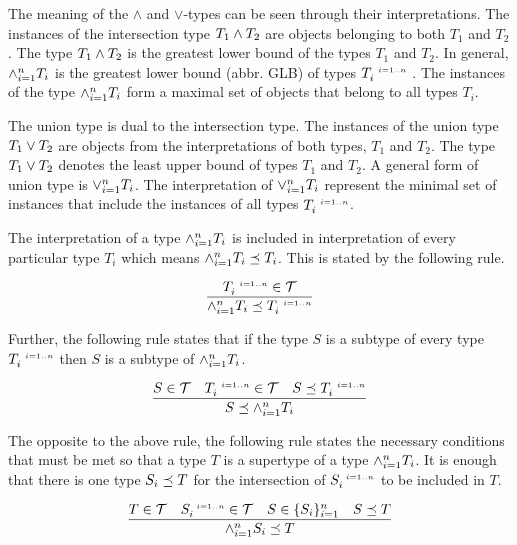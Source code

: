 \documentclass[runningheads]{llncs}
\newcommand{\s}{\scriptscriptstyle\ \,}
\newcommand{\T}{{\cal T}}
\begin{document}
The meaning of the $\land$ and $\lor$-types can be seen through
their interpretations. The instances of the intersection type
$T_1\land\/T_2$ are objects belonging to both $T_1$ and $T_2$. The
type $T_1\land\/T_2$ is the greatest lower bound of the types $T_1$
and $T_2$. In general, $\land_{i=1}^n\/T_i$ is the greatest lower
bound (abbr. GLB) of types $T_i^{\s\/i=1..n}$
\cite{Pierce1991,Pierce1996}. The instances of the type
$\land_{i=1}^n\/T_i$ form a maximal set of objects that belong to
all types $T_i$.

The union type is dual to the intersection type. The instances of
the union type $T_1\lor\/T_2$ are objects from the interpretations of
both types, $T_1$ and $T_2$. The type $T_1\lor\/T_2$ denotes the least
upper bound of types $T_1$ and $T_2$. A general form of union type is
$\lor_{i=1}^n\/T_i$. The interpretation of $\lor_{i=1}^n\/T_i$
represent the minimal set of instances that include the instances of
all types $T_i^{\s\/i=1..n}$.

The interpretation of a type $\land_{i=1}^n\/T_i$ is included in
interpretation of every particular type $T_i$ which means
$\land_{i=1}^n\/T_i\preceq\/T_i$. This is stated by the following
rule.

\begin{equation}
\label{rul:land-preceq-elems}
\dfrac{T_i^{\s\/i=1..n}\in\T}
      {\land_{i=1}^n\/T_i\preceq\/T_i^{\s\/i=1..n}} 
\end{equation}

Further, the following rule states that if the type $S$ is a subtype
of every type $T_i^{\s\/i=1..n}$ then $S$ is a subtype of
$\land_{i=1}^n\/T_i$.

\begin{equation}
\label{rul:lbound-preceq-land}
\dfrac{S\in\T\quad\/T_i^{\s\/i=1..n}\in\T\quad\/S\preceq\/T_i^{\s\/i=1..n}}
      {S\preceq\land_{i=1}^n\/T_i}  
\end{equation} 

The opposite to the above rule, the following rule states the
necessary conditions that must be met so that a type $T$ is a
supertype of a type $\land_{i=1}^n\/T_i$. It is enough that there is
one type $S_i\preceq\/T$ for the intersection of $S_i^{\s\/i=1..n}$ to
be included in $T$.

\begin{equation}
\label{rul:land-preceq-ubound}
\dfrac{T\in\T\quad\/S_i^{\s\/i=1..n}\in\T\quad\/S\in\{S_i\}_{i=1}^n\quad\/S\preceq\/T}
      {\land_{i=1}^n\/S_i\preceq\/T}  
\end{equation} 
\end{document}
